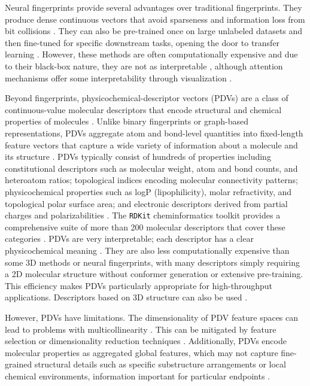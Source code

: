 Neural fingerprints provide several advantages over traditional fingerprints. They produce dense continuous vectors that avoid sparseness and information loss from bit collisions \citep{Jaeger2018}. They can also be pre-trained once on large unlabeled datasets and then fine-tuned for specific downstream tasks, opening the door to transfer learning \citep{Chithrananda2020, Fabian2020}. However, these methods are often computationally expensive \citep{Jaeger2018} and due to their black-box nature, they are not as interpretable \citep{Chithrananda2020}, although attention mechanisms offer some interpretability through visualization \citep{Chithrananda2020}.

Beyond fingerprints, physicochemical-descriptor vectors (PDVs) are a class of continuous-value molecular descriptors that encode structural and chemical properties of molecules \citep{Todeschini2009}. Unlike binary fingerprints or graph-based representations, PDVs aggregate atom and bond-level quantities into fixed-length feature vectors that capture a wide variety of information about a molecule and its structure \citep{Mauri2006}. PDVs typically consist of hundreds of properties including constitutional descriptors such as molecular weight, atom and bond counts, and heteroatom ratios; topological indices encoding molecular connectivity patterns; physicochemical properties such as logP (lipophilicity), molar refractivity, and topological polar surface area; and electronic descriptors derived from partial charges and polarizabilities \citep{Todeschini2009, Cherkasov2014}. The \texttt{RDKit} cheminformatics toolkit provides a comprehensive suite of more than 200 molecular descriptors that cover these categories \citep{rdkit}. PDVs are very interpretable; each descriptor has a clear physicochemical meaning \citep{Cherkasov2014}. They are also less computationally expensive than some 3D methods or neural fingerprints, with many descriptors simply requiring a 2D molecular structure without conformer generation or extensive pre-training. This efficiency makes PDVs particularly appropriate for high-throughput applications. Descriptors based on 3D structure can also be used \citep{Mauri2006}.

However, PDVs have limitations. The dimensionality of PDV feature spaces can lead to problems with multicollinearity \citep{Todeschini2009}. This can be mitigated by feature selection or dimensionality reduction techniques \citep{Cherkasov2014}. Additionally, PDVs encode molecular properties as aggregated global features, which may not capture fine-grained structural details such as specific substructure arrangements or local chemical environments, information important for particular endpoints \citep{Mauri2006}.

